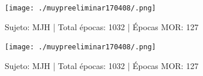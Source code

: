 \begin{figure}
\centering
\texttt{[image: ./muypreeliminar170408/.png]} 
\caption{Sujeto: MJH | Total \'epocas: 1032 | \'Epocas MOR: 127
}
\label{grf:MGG}
\end{figure}


\begin{figure}
\centering
\texttt{[image: ./muypreeliminar170408/.png]} 
\caption{Sujeto: MJH | Total \'epocas: 1032 | \'Epocas MOR: 127
}
\label{grf:EMT}
\end{figure}


